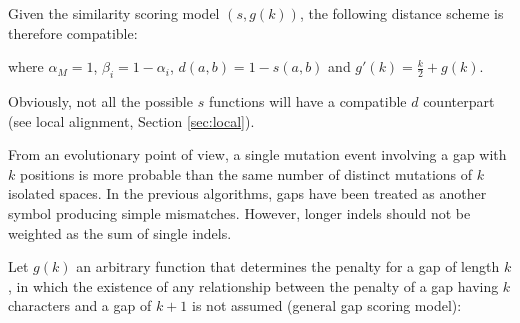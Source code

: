 Given the similarity scoring model $(s,g(k))$, the following distance scheme is therefore compatible:

\begin{center}
\end{center}

where $\alpha_M = 1$, $\beta_i=1-\alpha_i$, $d(a,b)= 1 - s(a,b)$ and $g'(k)=\frac{k}{2}+g(k)$.

Obviously, not all the possible $s$ functions will have a compatible $d$ counterpart (see local 
alignment, Section \ref{sec:local}). 


\label{sellersgen}

From an evolutionary point of view, a single mutation event involving a gap with $k$ positions is more 
probable than the same number of distinct mutations of $k$ isolated spaces. In the previous algorithms,
gaps have been treated as another symbol producing simple mismatches. However, longer indels should not
be weighted as the sum of single indels. 

Let $g(k)$ an arbitrary function that determines the penalty for a gap of length $k$, in which the 
existence of any relationship between the penalty of a gap having $k$ characters and a gap of $k+1$ is not 
assumed (general gap scoring model):

